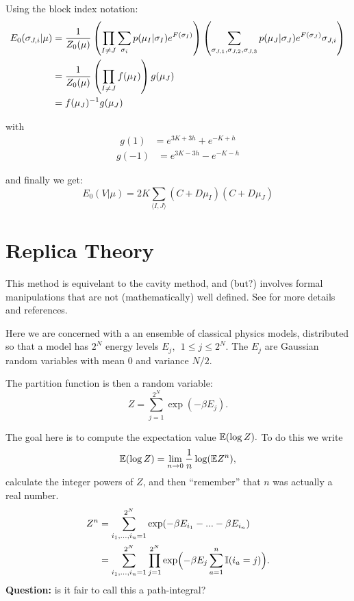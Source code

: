 \documentclass[11pt]{article}
\begin{document}
Using the block index notation:
\begin{align*}
E_{0}(\sigma_{J,i} | \mu) &= {{1} \over {Z_{0}(\mu)}}\left({\prod_{I \not = J} \sum_{\sigma_{i}} p(\mu_{I} | \sigma_{I})e^{F(\sigma_{I})}}\right)\left({\sum_{\sigma_{J,1},\sigma_{J,2},\sigma_{J,3}} p(\mu_{J} | \sigma_{J})e^{F(\sigma_{J})}\sigma_{J,i}}\right)\\
 &= {{1} \over {Z_{0}(\mu)}}\left({\prod_{I \not = J} f(\mu_{I})}\right)g(\mu_{J})\\
 &= f(\mu_{J})^{-1}g(\mu_{J})
\end{align*}

with
\begin{align*}
g(1) &= e^{3K+3h}+e^{-K+h}
\end{align*}
\begin{align*}
g(-1) &= e^{3K-3h}-e^{-K-h}
\end{align*}

and finally we get:
$$\boxed{E_{0}(V | \mu) = 2K\sum_{\langle I,J\rangle} (C+D\mu_{I})(C+D\mu_{J})}$$


%
%

\section{Replica Theory}

This method is equivelant to the cavity method, and (but?)
involves formal manipulations that are not (mathematically) well defined.
See \cite{Mezard2009,Parisi2007} for more details and references.

Here we are concerned with a an ensemble of classical physics models,
distributed so that a model
has $2^N$ energy levels $E_j,\ \ 1\le j\le 2^N$. The $E_j$ are
Gaussian random variables with mean $0$ and variance $N/2.$

The partition function is then a random variable:
$$
    Z = \sum_{j=1}^{2^N} \exp(-\beta E_j).
$$

The goal here is to compute the expectation value $\mathbb E(\log Z).$
To do this we write
$$
    \mathbb E(\log Z) = \lim_{n\to 0} \frac{1}{n} \log(\mathbb E Z^n),
$$
calculate the integer powers of $Z$, and then ``remember'' that
$n$ was actually a real number.
\begin{align*}
    Z^n &= \sum_{i_1,...,i_n=1}^{2^N} \exp(-\beta E_{i_1} - ... -\beta E_{i_n})\\
        &= \sum_{i_1,...,i_n=1}^{2^N} \prod_{j=1}^{2^N} \exp\Bigl(-\beta E_j \sum_{a=1}^n \mathbb I(i_a=j)\Bigr).
\end{align*}
{\bf Question:} is it fair to call this a path-integral?
\end{document}
